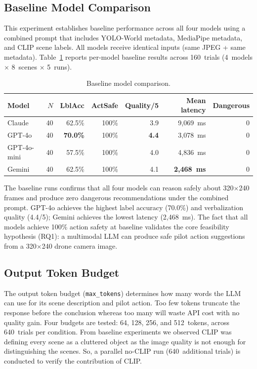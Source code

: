 \subsection{Baseline Model Comparison}
\label{sec:ch2_v1}

This experiment establishes baseline performance across all four models using a combined prompt that includes YOLO-World metadata, MediaPipe metadata, and CLIP scene labels. 
All models receive identical inputs (same JPEG + same metadata).
Table~\ref{tab:ch2_v1} reports per-model baseline results across 160~trials (4~models $\times$ 8~scenes $\times$ 5~runs).

\begin{table}[ht]
  \caption{Baseline model comparison.}
  \label{tab:ch2_v1}
  \centering
  \small
  \begin{tabular}{lrrrrrr}
    \toprule
    Model & $N$ & LblAcc & ActSafe & Quality/5 & Mean latency & Dangerous \\
    \midrule
    Claude       & 40 & 62.5\% & 100\% & 3.9 & 9,069~ms & 0 \\
    GPT-4o       & 40 & \textbf{70.0\%} & 100\% & \textbf{4.4} & 3,078~ms & 0 \\
    GPT-4o-mini  & 40 & 57.5\% & 100\% & 4.0 & 4,836~ms & 0 \\
    Gemini       & 40 & 62.5\% & 100\% & 4.1 & \textbf{2,468~ms} & 0 \\
    \midrule
  \end{tabular}
\end{table}

The baseline runs confirms that all four models can reason safely about 320$\times$240 frames and produce zero dangerous recommendations under the combined prompt. 
GPT-4o achieves the highest label accuracy (70.0\%) and
verbalization quality (4.4/5); Gemini achieves the lowest latency (2,468~ms).
The fact that all models achieve 100\% action safety at baseline validates the core feasibility hypothesis (RQ1): a multimodal LLM can produce safe pilot action suggestions from a 320$\times$240 drone camera image.
\subsection{Output Token Budget}
\label{sec:ch2_v6}
The output token budget (\texttt{max\_tokens}) determines how many words the LLM can use for its scene description and pilot action. 
Too few tokens truncate the response before the conclusion whereas too many will waste API cost with no quality gain.
Four budgets are tested: 64, 128, 256, and 512~tokens, across 640~trials per condition.
From baseline experiments we observed CLIP was defining every scene as a cluttered object as the image quality is not enough for distinguishing the scenes.
So, a parallel no-CLIP run (640~additional trials) is conducted to verify the contribution of CLIP.

